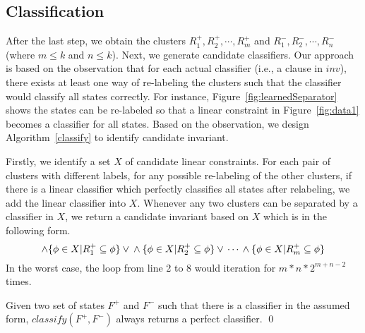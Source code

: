 
\subsection{Classification}
After the last step, we obtain the clusters $R^+_1, R^+_2, \cdots, R^+_m$ and $R^-_1, R^-_2, \cdots, R^-_n$ (where $m \leq k$ and $n \leq k$). Next, we generate candidate classifiers. Our approach is based on the observation that for each actual classifier (i.e., a clause in $inv$), there exists at least one way of re-labeling the clusters such that the classifier would classify all states correctly. For instance, Figure~\ref{fig:learnedSeparator} shows the states can be re-labeled so that a linear constraint in Figure~\ref{fig:data1} becomes a classifier for all states. Based on the observation, we design Algorithm~\ref{classify} to identify candidate invariant.

Firstly, we identify a set $X$ of candidate linear constraints. For each pair of clusters with different labels, for any possible re-labeling of the other clusters, if there is a linear classifier which perfectly classifies all states after relabeling, we add the linear classifier into $X$. Whenever any two clusters can be separated by a classifier in $X$, we return a candidate invariant based on $X$ which is in the following form.
\[
    \land \{ \phi \in X | R^+_1 \subseteq \phi \} \lor \\
    \land \{ \phi \in X | R^+_2 \subseteq \phi \} \lor \\
    \cdots \\
    \land \{ \phi \in X | R^+_m \subseteq \phi \}
\]
In the worst case, the loop from line 2 to 8 would iteration for $m*n*2^{m+n-2}$ times.

\begin{example}

\end{example}

\begin{proposition}
Given two set of states $F^+$ and $F^-$ such that there is a classifier in the assumed form, $classify(F^+,F^-)$ always returns a perfect classifier. \hfill \qed
\end{proposition}

